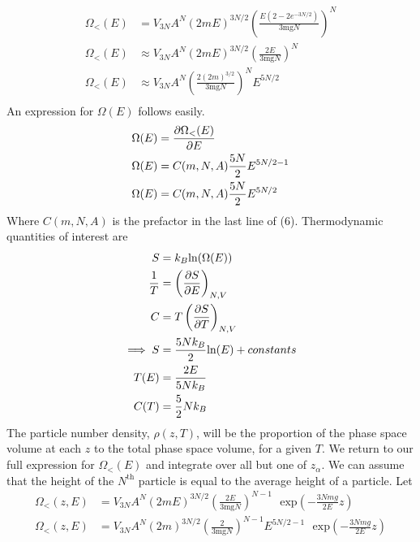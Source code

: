 \documentclass[]{book}
\begin{document}
\begin{enumerate}[1)]
\begin{equation}
\begin{split}
\Omega_<(E) & =V_{3N}A^N\left( 2mE\right)^{3N/2}  \left(\frac{E \left(2-2
   e^{-3 N/2}\right)}{\text{3mg}
   N}\right)^N \\ 
\Omega_<(E) & \approx V_{3N}A^N\left( 2mE\right)^{3N/2}  \left(\frac{2 E}{\text{3mg}
   N}\right)^N \\ 
\Omega_<(E) & \approx V_{3N}A^N  \left(\frac{2 (2m)^{3/2}}{\text{3mg}
   N}\right)^N E^{5N/2} \\ 
\end{split}
\end{equation}
An expression for $\Omega(E)$ follows easily.
\begin{equation}
\begin{split}
\Omega(E) & =  \pdv{\Omega_<(E)}{E} \\
\Omega(E) & = C(m ,N,A) \frac{5N}{2} E^{5N/2-1} \\
\Omega(E) & = C(m ,N,A) \frac{5N}{2} E^{5N/2} \\
\end{split}
\end{equation}
Where $C(m ,N,A)$ is the prefactor in the last line of (6). Thermodynamic quantities of interest are 
\begin{equation}
\begin{split}
S & = k_B\text{ln}(\Omega(E)) \\
\frac{1}{T} & = \left( \pdv{S}{E} \right)_{N,V} \\
C & = T \left( \pdv{S}{T} \right)_{N,V} \\
\implies S & = \frac{5Nk_B }{2}\text{ln}(E) + constants \\
T(E) & = \frac{2E}{5Nk_B} \\
C(T) & = \frac{5}{2} Nk_B
\end{split}
\end{equation}
The particle number density, $\rho(z,T)$, will be the proportion of the phase space volume at each $z$ to the total phase space volume, for a given $T$. We return to our full expression for $\Omega_<(E)$ and integrate over all but one of $z_\alpha$. We can assume that the height of the $N^{\text{th}}$ particle is equal to the average height of a particle. Let
\begin{equation}
\begin{split}
\Omega_<(z,E) & =V_{3N} A^N\left( 2mE\right)^{3N/2} \left(\frac{2 E}{\text{3mg}
   N}\right)^{N-1} \text{ } \text{exp}\left( - \frac{3Nmg}{2E}  z \right)  \\ 
\Omega_<(z,E) & =V_{3N} A^N\left( 2m\right)^{3N/2} \left(\frac{2 }{\text{3mg}
   N}\right)^{N-1} E^{5N/2-1}\text{ } \text{exp}\left( - \frac{3Nmg}{2E}  z \right)  \\ 

\end{split}
\end{equation}
\end{enumerate}
\end{document}
